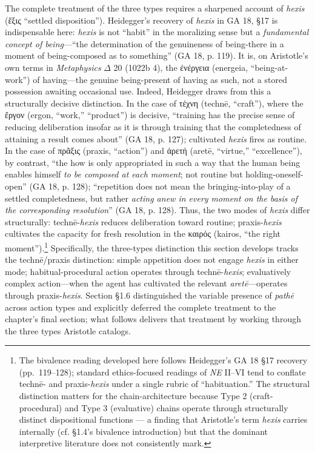 \documentclass{article}
\newcommand{\gk}[1]{{\greekfont #1}}
\begin{document}
The complete treatment of the three types requires a sharpened account of \textit{hexis} (\gk{ἕξις} ``settled disposition''). Heidegger's recovery of \textit{hexis} in GA 18, §17 is indispensable here: \textit{hexis} is not ``habit'' in the moralizing sense but a \textit{fundamental concept of being}---``the determination of the genuineness of being-there in a moment of being-composed as to something'' (GA 18, p. 119). It is, on Aristotle's own terms in \textit{Metaphysics} $\Delta$ 20 (1022b 4), the \gk{ἐνέργεια} (energeia, ``being-at-work'') of having---the genuine being-present of having as such, not a stored possession awaiting occasional use. Indeed, Heidegger draws from this a structurally decisive distinction. In the case of \gk{τέχνη} (technē, ``craft''), where the \gk{ἔργον} (ergon, ``work,'' ``product'') is decisive, ``training has the precise sense of reducing deliberation insofar as it is through training that the completedness of attaining a result comes about'' (GA 18, p. 127); cultivated \textit{hexis} fires as routine. In the case of \gk{πρᾶξις} (praxis, ``action'') and \gk{ἀρετή} (aretē, ``virtue,'' ``excellence''), by contrast, ``the how is only appropriated in such a way that the human being enables himself \textit{to be composed at each moment}; not routine but holding-oneself-open'' (GA 18, p. 128); ``repetition does not mean the bringing-into-play of a settled completedness, but rather \textit{acting anew in every moment on the basis of the corresponding resolution}'' (GA 18, p. 128). Thus, the two modes of \textit{hexis} differ structurally: technē-\textit{hexis} reduces deliberation toward routine; praxis-\textit{hexis} cultivates the capacity for fresh resolution in the \gk{καιρός} (kairos, ``the right moment'').\footnote{The bivalence reading developed here follows Heidegger's GA 18 \S 17 recovery (pp.~119--128); standard ethics-focused readings of \textit{NE} II--VI tend to conflate technē- and praxis-\textit{hexis} under a single rubric of ``habituation.'' The structural distinction matters for the chain-architecture because Type 2 (craft-procedural) and Type 3 (evaluative) chains operate through structurally distinct dispositional functions --- a finding that Aristotle's term \textit{hexis} carries internally (cf. \S 1.4's bivalence introduction) but that the dominant interpretive literature does not consistently mark.} Specifically, the three-types distinction this section develops tracks the technē/praxis distinction: simple appetition does not engage \textit{hexis} in either mode; habitual-procedural action operates through technē-\textit{hexis}; evaluatively complex action---when the agent has cultivated the relevant \textit{aretē}---operates through praxis-\textit{hexis}. Section \S 1.6 distinguished the variable presence of \textit{pathē} across action types and explicitly deferred the complete treatment to the chapter's final section; what follows delivers that treatment by working through the three types Aristotle catalogs.
\end{document}
